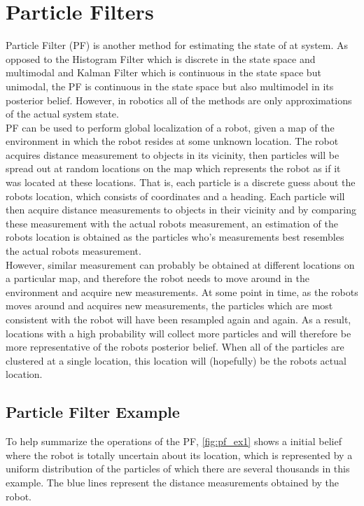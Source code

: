 
\section{Particle Filters}

Particle Filter (PF) is another method for estimating the state of at system. As opposed to the Histogram Filter which is discrete in the state space and multimodal and Kalman Filter which is continuous in the state space but unimodal, the PF is continuous in the state space but also multimodel in its posterior belief. However, in robotics all of the methods are only approximations of the actual system state.\\

PF can be used to perform global localization of a robot, given a map of the environment in which the robot resides at some unknown location. The robot acquires distance measurement to objects in its vicinity, then particles will be spread out at random locations on the map which represents the robot as if it was located at these locations. That is, each particle is a discrete guess about the robots location, which consists of coordinates and a heading. Each particle will then acquire distance measurements to objects in their vicinity and by comparing these measurement with the actual robots measurement, an estimation of the robots location is obtained as the particles who's measurements best resembles the actual robots measurement.\\
However, similar measurement can probably be obtained at different locations on a particular map, and therefore the robot needs to move around in the environment and acquire new measurements. At some point in time, as the robots moves around and acquires new measurements, the particles which are most consistent with the robot will have been resampled again and again. As a result, locations with a high probability will collect more particles and will therefore be more representative of the robots posterior belief. When all of the particles are clustered at a single location, this location will (hopefully) be the robots actual location.\\

\subsection{Particle Filter Example}

To help summarize the operations of the PF, \autoref{fig:pf_ex1} shows a initial belief where the robot is totally uncertain about its location, which is represented by a uniform distribution of the particles of which there are several thousands in this example. The blue lines represent the distance measurements obtained by the robot.

